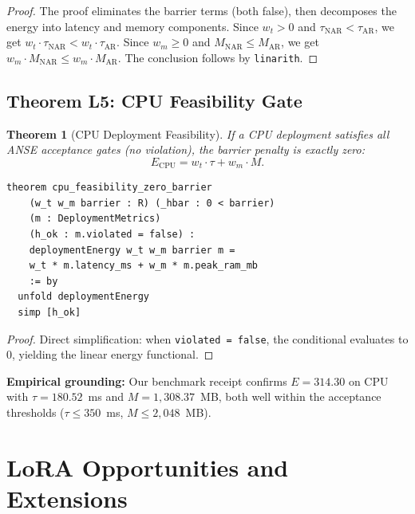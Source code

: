 \documentclass[10pt,journal,compsoc]{IEEEtran}
\newtheorem{theorem}{Theorem}
\theoremstyle{remark}
\begin{document}
\begin{proof}
The proof eliminates the barrier terms (both false), then decomposes the energy into latency and memory components. Since $w_t > 0$ and $\tau_{\text{NAR}} < \tau_{\text{AR}}$, we get $w_t \cdot \tau_{\text{NAR}} < w_t \cdot \tau_{\text{AR}}$. Since $w_m \geq 0$ and $M_{\text{NAR}} \leq M_{\text{AR}}$, we get $w_m \cdot M_{\text{NAR}} \leq w_m \cdot M_{\text{AR}}$. The conclusion follows by \texttt{linarith}.
\end{proof}

\subsection{Theorem L5: CPU Feasibility Gate}

\begin{theorem}[CPU Deployment Feasibility]
If a CPU deployment satisfies all ANSE acceptance gates (no violation), the barrier penalty is exactly zero:
\begin{equation}
E_{\text{CPU}} = w_t \cdot \tau + w_m \cdot M.
\end{equation}
\end{theorem}

\begin{lstlisting}[caption={Theorem L5 in Lean 4 --- Fully Proved}]
theorem cpu_feasibility_zero_barrier
    (w_t w_m barrier : R) (_hbar : 0 < barrier)
    (m : DeploymentMetrics)
    (h_ok : m.violated = false) :
    deploymentEnergy w_t w_m barrier m =
    w_t * m.latency_ms + w_m * m.peak_ram_mb
    := by
  unfold deploymentEnergy
  simp [h_ok]
\end{lstlisting}

\begin{proof}
Direct simplification: when \texttt{violated = false}, the conditional evaluates to 0, yielding the linear energy functional.
\end{proof}

\textbf{Empirical grounding:} Our benchmark receipt confirms $E = 314.30$ on CPU with $\tau = 180.52$~ms and $M = 1{,}308.37$~MB, both well within the acceptance thresholds ($\tau \leq 350$~ms, $M \leq 2{,}048$~MB).

\section{LoRA Opportunities and Extensions}
\end{document}
